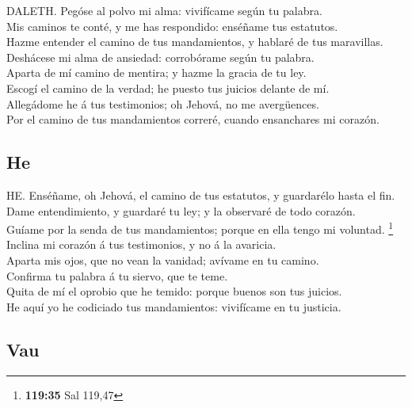  DALETH. Pegóse al polvo mi alma: vivifícame según tu
palabra.\\
 Mis caminos te conté, y me has respondido: enséñame tus
estatutos.\\
 Hazme entender el camino de tus mandamientos, y hablaré
de tus maravillas.\\
 Deshácese mi alma de ansiedad: corrobórame según tu
palabra.\\
 Aparta de mí camino de mentira; y hazme la gracia de tu
ley.\\
 Escogí el camino de la verdad; he puesto tus juicios
delante de mí.\\
 Allegádome he á tus testimonios; oh Jehová, no me
avergüences.\\
 Por el camino de tus mandamientos correré, cuando
ensanchares mi corazón.

\hypertarget{he}{%
\subsection{He}\label{he}}

 HE. Enséñame, oh Jehová, el camino de tus estatutos, y
guardarélo hasta el fin.\\
 Dame entendimiento, y guardaré tu ley; y la observaré de
todo corazón.\\
 Guíame por la senda de tus mandamientos; porque en ella
tengo mi voluntad. \footnote{\textbf{119:35} Sal 119,47}\\
 Inclina mi corazón á tus testimonios, y no á la
avaricia.\\
 Aparta mis ojos, que no vean la vanidad; avívame en tu
camino.\\
 Confirma tu palabra á tu siervo, que te teme.\\
 Quita de mí el oprobio que he temido: porque buenos son
tus juicios.\\
 He aquí yo he codiciado tus mandamientos: vivifícame en
tu justicia.

\hypertarget{vau}{%
\subsection{Vau}\label{vau}}

